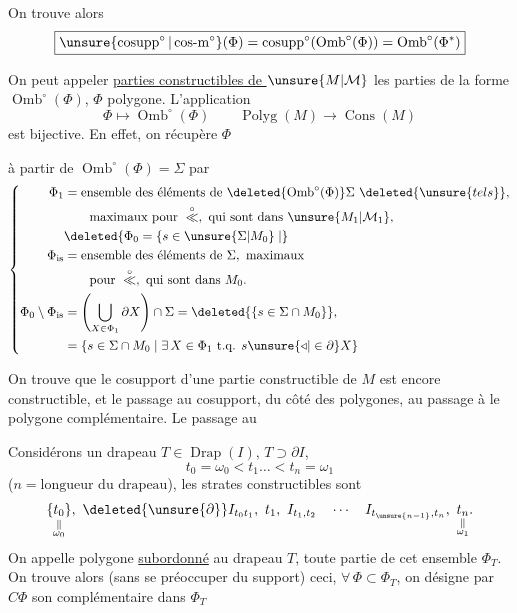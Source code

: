 On trouve alors
\[
\boxed{\unsure{\operatorname{cosupp}^{\circ}|\operatorname{cos-m}^{\circ}}(\Phi)=\operatorname{cosupp}^{\circ}(\operatorname{Omb}^{\circ}(\Phi))=\operatorname{Omb}^{\circ}(\Phi^*)}
\]

On peut appeler \uline{parties constructibles de $\unsure{M|\mathcal M}$} les parties de la forme $\operatorname{Omb}^{\circ}(\Phi)$, $\Phi$ polygone.  L'application
\[
\Phi\longmapsto\operatorname{Omb}^{\circ}(\Phi)\qquad\operatorname{Polyg}(M)\longrightarrow\operatorname{Cons}(M)
\]
est bijective. En effet, on récupère $\Phi$

à partir de $\operatorname{Omb}^{\circ}(\Phi)=\Sigma$ par
\[
\left\{\begin{aligned}
\Phi_1&=\text{ensemble des éléments de }\deleted{\operatorname{Omb}^{\circ}(\Phi)}\Sigma\ \deleted{\unsure{tels}},\\
&\qquad\text{maximaux pour }\overset{\circ}{\ll},\text{ qui sont dans }\unsure{M_1|\mathcal M_1},\\
&\deleted{\Phi_0=\{s\in\unsure{\Sigma|M_0}\mid}\\
\Phi_{\mathrm{is}}&=\text{ensemble des éléments de }\Sigma,\text{ maximaux}\\
&\qquad\text{pour }\overset{\circ}{\ll},\text{ qui sont dans }M_0.\\
\Phi_0\setminus\Phi_{\mathrm{is}}&=\left(\bigcup_{X\in\Phi_1}\partial X\right)\cap\Sigma
 =\deleted{\{s\in\Sigma\cap M_0\}},\\
&=\{s\in\Sigma\cap M_0\mid\exists\,X\in\Phi_1\text{ t.q. }s\unsure{\triangleleft|\in\partial}X\}
\end{aligned}\right.
\]

On trouve que le cosupport d'une partie constructible de $M$ est encore constructible, et le passage au cosupport,  du côté des polygones, au passage à  le polygone complémentaire. Le passage au 

Considérons un drapeau $T\in\operatorname{Drap}(I)$, $T\supset\partial I$,
\[
t_0=\omega_0<t_1\ldots<t_n=\omega_1
\]
($n=\text{longueur du drapeau}$), les strates constructibles sont
\[
\underset{\substack{\Vert\\\omega_0}}{\{t_0\}},\ \deleted{\unsure{\partial}}I_{t_0t_1},\ t_1,\ I_{t_1,t_2}\quad\cdots\quad I_{t_{\unsure{n-1}},t_n},\ \underset{\substack{\Vert\\\omega_1}}{t_n}.
\]
On appelle polygone \uline{subordonné} au drapeau $T$, toute partie \inserted{$\Phi$} de cet ensemble $\Phi_T$. On trouve alors (sans se préoccuper du support) ceci, $\forall\,\Phi\subset\Phi_T$, on désigne par $C\Phi$ son complémentaire dans $\Phi_T$

